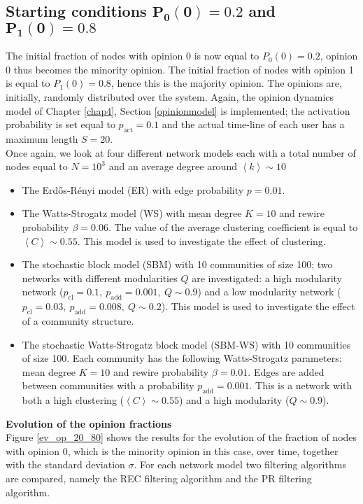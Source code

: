 \documentclass[11 pt , letterpaper , twoside , openright]{book}
\begin{document}
\subsection{Starting conditions $\bm{P_0(0) = 0.2}$ and $\bm{P_1(0)=0.8}$}

The initial fraction of nodes with opinion 0 is now equal to $P_0(0) = 0.2$, opinion 0 thus becomes the minority opinion. The initial fraction of nodes with opinion 1 is equal to $P_1(0) = 0.8$, hence this is the majority opinion. The opinions are, initially, randomly distributed over the system. Again, the opinion dynamics model of Chapter \ref{chap4}, Section \ref{opinionmodel} is implemented; the activation probability is set equal to $p_{\text{act}} = 0.1$ and the actual time-line of each user has a maximum length $S = 20$.\\
\newline
Once again, we look at four different network models each with a total number of nodes equal to $N = 10^3$ and an average degree around $\left<k\right> \sim 10$
\begin{itemize}
	\item The Erd\H{o}s-R\'{e}nyi model (ER) with edge probability $p = 0.01$.
	\item The Watts-Strogatz model (WS) with mean degree $K=10$ and rewire probability $\beta = 0.06$. The value of the average clustering coefficient is equal to $\left<C\right> \sim 0.55$. This model is used to investigate the effect of clustering.
	\newpage
	\item The stochastic block model (SBM) with 10 communities of size 100; two networks with different modularities $Q$ are investigated: a high modularity network ($p_{\text{cl}} = 0.1,\ p_{\text{add}} = 0.001,\ Q \sim 0.9$) and a low modularity network ($p_{\text{cl}} = 0.03,\ p_{\text{add}} = 0.008,\ Q \sim 0.2$). This model is used to investigate the effect of a community structure.
	\item The stochastic Watts-Strogatz block model (SBM-WS) with 10 communities of size 100. Each community has the following Watts-Strogatz parameters: mean degree $K =10$ and rewire probability $\beta = 0.01$. Edges are added between communities with a probability $p_{\text{add}} = 0.001$. This is a network with both a high clustering ($\left<C\right> \sim 0.55$) and a high modularity ($Q \sim 0.9$).
\end{itemize}
\textbf{Evolution of the opinion fractions}\\
\newline
Figure \ref{ev_op_20_80} shows the results for the evolution of the fraction of nodes with opinion 0, which is the minority opinion in this case, over time, together with the standard deviation $\sigma$. For each network model two filtering algorithms are compared, namely the REC filtering algorithm and the PR filtering algorithm. \\
\end{document}
